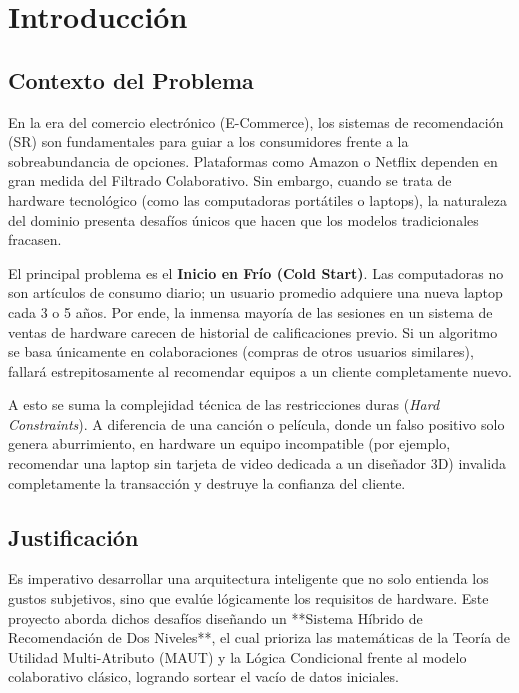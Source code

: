 \documentclass[12pt,a4paper]{report}
\begin{document}
\tableofcontents
\newpage

\pagestyle{fancy}
\fancyhf{}
\cfoot{\thepage}

\chapter{Introducción}
\section{Contexto del Problema}
En la era del comercio electrónico (E-Commerce), los sistemas de recomendación (SR) son fundamentales para guiar a los consumidores frente a la sobreabundancia de opciones. Plataformas como Amazon o Netflix dependen en gran medida del Filtrado Colaborativo. Sin embargo, cuando se trata de hardware tecnológico (como las computadoras portátiles o laptops), la naturaleza del dominio presenta desafíos únicos que hacen que los modelos tradicionales fracasen.

El principal problema es el \textbf{Inicio en Frío (Cold Start)}. Las computadoras no son artículos de consumo diario; un usuario promedio adquiere una nueva laptop cada 3 o 5 años. Por ende, la inmensa mayoría de las sesiones en un sistema de ventas de hardware carecen de historial de calificaciones previo. Si un algoritmo se basa únicamente en colaboraciones (compras de otros usuarios similares), fallará estrepitosamente al recomendar equipos a un cliente completamente nuevo.

A esto se suma la complejidad técnica de las restricciones duras (\textit{Hard Constraints}). A diferencia de una canción o película, donde un falso positivo solo genera aburrimiento, en hardware un equipo incompatible (por ejemplo, recomendar una laptop sin tarjeta de video dedicada a un diseñador 3D) invalida completamente la transacción y destruye la confianza del cliente.

\section{Justificación}
Es imperativo desarrollar una arquitectura inteligente que no solo entienda los gustos subjetivos, sino que evalúe lógicamente los requisitos de hardware. Este proyecto aborda dichos desafíos diseñando un **Sistema Híbrido de Recomendación de Dos Niveles**, el cual prioriza las matemáticas de la Teoría de Utilidad Multi-Atributo (MAUT) y la Lógica Condicional frente al modelo colaborativo clásico, logrando sortear el vacío de datos iniciales.
\end{document}
